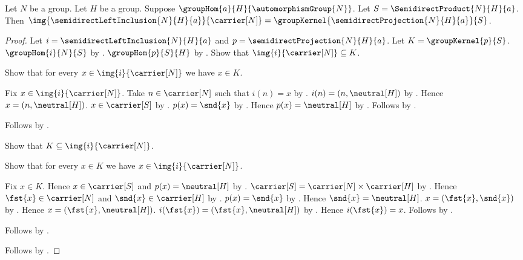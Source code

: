 \begin{theorem}\label{semidirect_left_image_is_projection_kernel}
    Let $N$ be a group.
    Let $H$ be a group.
    Suppose $\groupHom{a}{H}{\automorphismGroup{N}}$.
    Let $S=\SemidirectProduct{N}{H}{a}$.
    Then
        $\img{\semidirectLeftInclusion{N}{H}{a}}{\carrier[N]}=
            \groupKernel{\semidirectProjection{N}{H}{a}}{S}$.
\end{theorem}
\begin{proof}
    Let $i=\semidirectLeftInclusion{N}{H}{a}$ and
        $p=\semidirectProjection{N}{H}{a}$.
    Let $K=\groupKernel{p}{S}$.
    $\groupHom{i}{N}{S}$ by .
    $\groupHom{p}{S}{H}$ by .
    Show that $\img{i}{\carrier[N]}\subseteq K$.
    \begin{subproof}
        Show that for every $x\in\img{i}{\carrier[N]}$ we have $x\in K$.
        \begin{subproof}
            Fix $x\in\img{i}{\carrier[N]}$.
            Take $n\in\carrier[N]$ such that $i(n)=x$ by
                .
            $i(n)=(n,\neutral[H])$ by
                .
            Hence $x=(n,\neutral[H])$.
            $x\in\carrier[S]$ by .
            $p(x)=\snd{x}$ by .
            Hence $p(x)=\neutral[H]$ by .
            Follows by .
        \end{subproof}
        Follows by .
    \end{subproof}
    Show that $K\subseteq\img{i}{\carrier[N]}$.
    \begin{subproof}
        Show that for every $x\in K$ we have
            $x\in\img{i}{\carrier[N]}$.
        \begin{subproof}
            Fix $x\in K$.
            Hence $x\in\carrier[S]$ and $p(x)=\neutral[H]$ by
                .
            $\carrier[S]=\carrier[N]\times\carrier[H]$ by
                .
            Hence $\fst{x}\in\carrier[N]$ and
                $\snd{x}\in\carrier[H]$ by
                .
            $p(x)=\snd{x}$ by .
            Hence $\snd{x}=\neutral[H]$.
            $x=(\fst{x},\snd{x})$ by
                .
            Hence $x=(\fst{x},\neutral[H])$.
            $i(\fst{x})=(\fst{x},\neutral[H])$ by
                .
            Hence $i(\fst{x})=x$.
            Follows by
                .
        \end{subproof}
        Follows by .
    \end{subproof}
    Follows by .
\end{proof}


